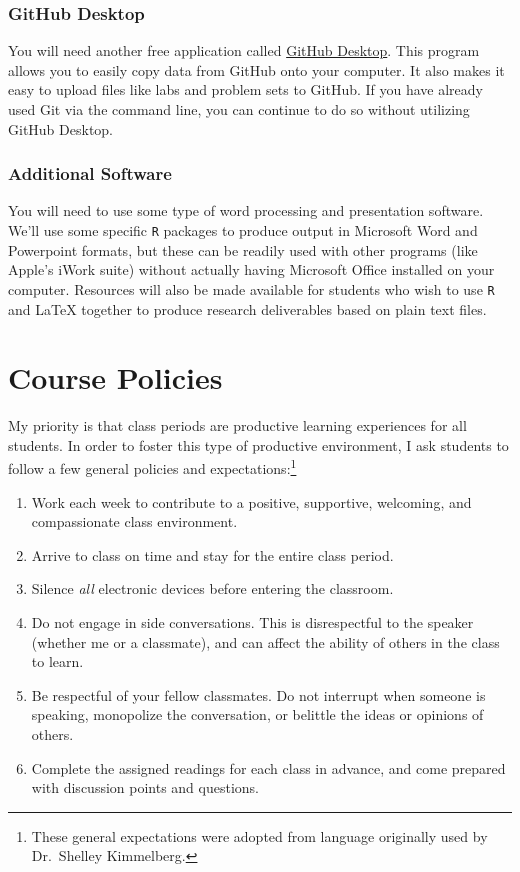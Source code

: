 \documentclass[]{book}
\providecommand{\tightlist}{%
  \setlength{\itemsep}{0pt}\setlength{\parskip}{0pt}}
\let\rmarkdownfootnote\footnote%
\def\footnote{\protect\rmarkdownfootnote}
\theoremstyle{definition}
\theoremstyle{definition}
\theoremstyle{definition}
\theoremstyle{remark}
\begin{document}
\hypertarget{github-desktop}{%
\subsection{GitHub Desktop}\label{github-desktop}}

You will need another free application called
\href{https://desktop.github.com}{GitHub Desktop}. This program allows
you to easily copy data from GitHub onto your computer. It also makes it
easy to upload files like labs and problem sets to GitHub. If you have
already used Git via the command line, you can continue to do so without
utilizing GitHub Desktop.

\hypertarget{additional-software}{%
\subsection{Additional Software}\label{additional-software}}

You will need to use some type of word processing and presentation
software. We'll use some specific \texttt{R} packages to produce output
in Microsoft Word and Powerpoint formats, but these can be readily used
with other programs (like Apple's iWork suite) without actually having
Microsoft Office installed on your computer. Resources will also be made
available for students who wish to use \texttt{R} and LaTeX together to
produce research deliverables based on plain text files.

\hypertarget{course-policies}{%
\chapter{Course Policies}\label{course-policies}}

My priority is that class periods are productive learning experiences
for all students. In order to foster this type of productive
environment, I ask students to follow a few general policies and
expectations:\footnote{These general expectations were adopted from
  language originally used by Dr.~Shelley Kimmelberg.}

\begin{enumerate}
\def\labelenumi{\arabic{enumi}.}
\tightlist
\item
  Work each week to contribute to a positive, supportive, welcoming, and
  compassionate class environment.
\item
  Arrive to class on time and stay for the entire class period.
\item
  Silence \emph{all} electronic devices before entering the classroom.
\item
  Do not engage in side conversations. This is disrespectful to the
  speaker (whether me or a classmate), and can affect the ability of
  others in the class to learn.
\item
  Be respectful of your fellow classmates. Do not interrupt when someone
  is speaking, monopolize the conversation, or belittle the ideas or
  opinions of others.
\item
  Complete the assigned readings for each class in advance, and come
  prepared with discussion points and questions.
\end{enumerate}
\end{document}
